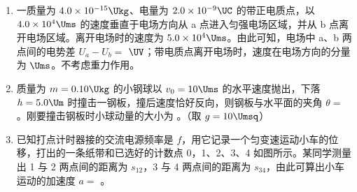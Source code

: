 \documentclass[\gkver]{gaokaozhenti}
\begin{document}
\begin{enumerate}

\item
一质量为 $4.0\times10^{-15}\Ukg$、电量为 $2.0\times10^{-9}\UC$ 的带正电质点，以 $4.0\times10^{4}\Ums$ 的速度垂直于电场方向从 a 点进入匀强电场区域，并从 b 点离开电场区域。离开电场时的速度为 $5.0\times10^{4}\Ums$。由此可知，电场中 a、b 两点间的电势差 $U_{a}-U_{b}=$ $\UV$；带电质点离开电场时，速度在电场方向的分量为 $\Ums$。不考虑重力作用。


\item
质量为 $m=0.10\Ukg$ 的小钢球以 $v_{0}=10\Ums$ 的水平速度抛出，下落 $h=5.0\Um$ 时撞击一钢板，撞后速度恰好反向，则钢板与水平面的夹角 $\theta=$ \tkanswer[2cm]{$45\Udu$}。刚要撞击钢板时小球动量的大小为 。（取 $g=10\Umsq$）



\item
已知打点计时器接的交流电源频率是 $f$，用它记录一个匀变速运动小车的位移，打出的一条纸带和已选好的计数点 0，1、2、3、4 如图所示。某同学测量出 1 与 2 两点间的距离为 $s_{12}$，3 与 4 两点间的距离为 $s_{34}$，由此可算出小车运动的加速度 $a=$ 。




\end{enumerate}
\end{document}
